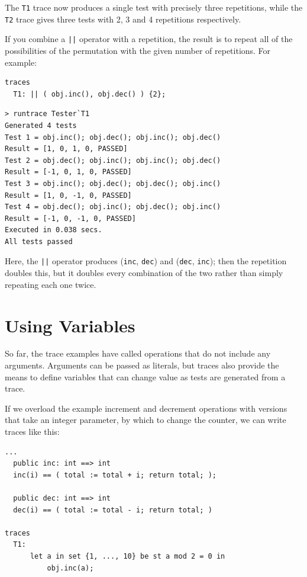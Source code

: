 \documentclass{overturerepchap}
\begin{document}
The \texttt{T1} trace now produces a single test with precisely three repetitions, while
the \texttt{T2} trace gives three tests with 2, 3 and 4 repetitions respectively.

If you combine a \texttt{||} operator with a repetition, the result is to repeat
all of the possibilities of the permutation with the given number of repetitions.
For example:

\small
\begin{lstlisting}
traces
  T1: || ( obj.inc(), obj.dec() ) {2};
\end{lstlisting}

\lstset{style=tool,language=}
\begin{lstlisting}[escapechar=@]
> runtrace Tester`T1
Generated 4 tests
Test 1 = obj.inc(); obj.dec(); obj.inc(); obj.dec()
Result = [1, 0, 1, 0, PASSED]
Test 2 = obj.dec(); obj.inc(); obj.inc(); obj.dec()
Result = [-1, 0, 1, 0, PASSED]
Test 3 = obj.inc(); obj.dec(); obj.dec(); obj.inc()
Result = [1, 0, -1, 0, PASSED]
Test 4 = obj.dec(); obj.inc(); obj.dec(); obj.inc()
Result = [-1, 0, -1, 0, PASSED]
Executed in 0.038 secs. 
All tests passed
\end{lstlisting}
\lstset{style=mystyle}
\lstset{language=VDM++}
\normalsize

Here, the \texttt{||} operator produces (\texttt{inc}, \texttt{dec}) and (\texttt{dec}, \texttt{inc}); then the
repetition doubles this, but it doubles every combination of the two rather than
simply repeating each one twice.

\section{Using Variables}

So far, the trace examples have called operations that do not include any
arguments. Arguments can be passed as literals, but traces also provide the
means to define variables that can change value as tests are generated from a
trace.

If we overload the example increment and decrement operations with versions that
take an integer parameter, by which to change the counter, we can write traces
like this:

\small
\begin{lstlisting}
...
  public inc: int ==> int
  inc(i) == ( total := total + i; return total; );

  public dec: int ==> int
  dec(i) == ( total := total - i; return total; )

traces
  T1:
      let a in set {1, ..., 10} be st a mod 2 = 0 in
          obj.inc(a);
\end{lstlisting}
\end{document}
